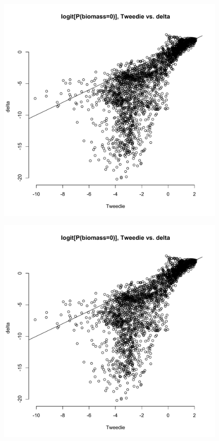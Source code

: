 \documentclass[authoryear, review, 11pt]{elsarticle}
\begin{document}
\begin{figure}
	\begin{center}
	\includegraphics[width=5in]{../../figures/Exploration/Oak-P0-biomass-tweedie2-v-delta.pdf}
	\caption{\label{fig:oaks-biomass-spline}}
	\end{center}
\end{figure}

\begin{figure}
	\begin{center}
	\includegraphics[width=5in]{../../figures/Exploration/Oak-P0-biomass-tweedie2-v-delta.pdf}
	\caption{\label{fig:oaks-biomass-spline}}
	\end{center}
\end{figure}
\end{document}
